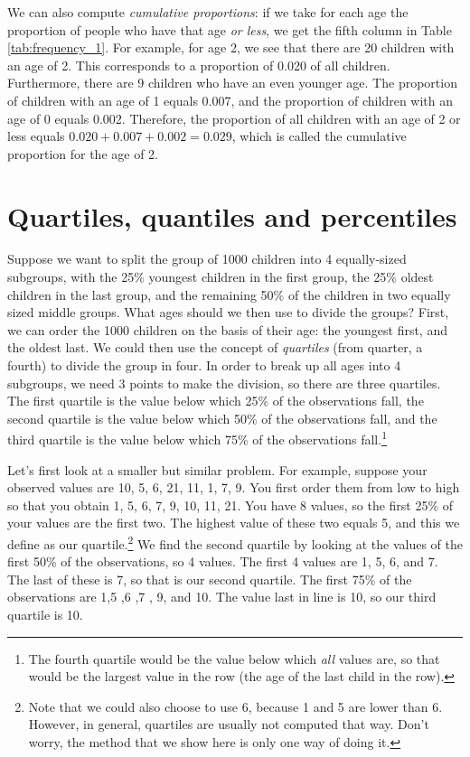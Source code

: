 \documentclass[]{report}\usepackage[]{graphicx}\usepackage[]{color}
\begin{document}
We can also compute \textit{cumulative proportions}: if we take for each age the proportion of people who have that age \textit{or less}, we get the fifth column in Table \ref{tab:frequency_1}. For example, for age 2, we see that there are 20 children with an age of 2. This corresponds to a proportion of 0.020 of all children. Furthermore, there are 9 children who have an even younger age. The proportion of children with an age of 1 equals 0.007, and the proportion of children with an age of 0 equals 0.002. Therefore, the proportion of all children with an age of 2 or less equals $0.020+0.007+0.002=0.029$, which is called the cumulative proportion for the age of 2. 



\section{Quartiles, quantiles and percentiles}

Suppose we want to split the group of 1000 children into 4 equally-sized subgroups, with the 25\% youngest children in the first group, the 25\% oldest children in the last group, and the remaining 50\% of the children in two equally sized middle groups. What ages should we then use to divide the groups? First, we can order the 1000 children on the basis of their age: the youngest first, and the oldest last. We could then use the concept of \textit{quartiles} (from quarter, a fourth) to divide the group in four. In order to break up all ages into 4 subgroups, we need 3 points to make the division, so there are three quartiles. The first quartile is the value below which 25\% of the observations fall, the second quartile is the value below which 50\% of the observations fall, and the third quartile is the value below which 75\% of the observations fall.\footnote{The fourth quartile would be the value below which \textit{all} values are, so that would be the largest value in the row (the age of the last child in the row).}

Let's first look at a smaller but similar problem. For example, suppose your observed values are {10, 5, 6, 21, 11, 1, 7, 9}. You first order them from low to high so that you obtain {1, 5, 6, 7, 9, 10, 11, 21}. You have 8 values, so the first 25\% of your values are the first two. The highest value of these two equals 5, and this we define as our quartile.\footnote{Note that we could also choose to use 6, 
because 1 and 5 are lower than 6. However, in general, quartiles are usually not computed that way. Don't worry, the method that we show here is only one way of doing it.} We find the second quartile by looking at the values of the first 50\% of the observations, so 4 values. The first 4 values are 1, 5, 6, and 7. The last of these is 7, so that is our second quartile. The first 75\% of the observations are 1,5 ,6 ,7 , 9, and 10. The value last in line is 10, so our third quartile is 10. 
\end{document}

